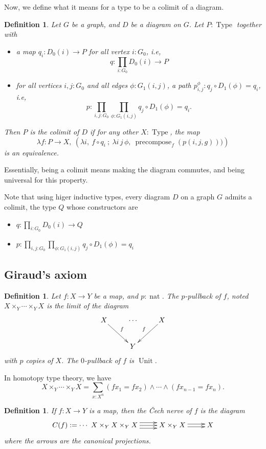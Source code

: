 \documentclass[conference]{IEEEtran}
\makeatletter
\newtheorem{defi}[thm]{Definition}
\newcommand{\ie}{i.e,\xspace}
\def\dar[#1]#2{\ar@<-#2>[#1]\ar@<#2>[#1]} %
\def\tar[#1]#2{\ar@<#2>[#1]\ar@<0pt>[#1]\ar@<-#2>[#1]} %
\DeclareMathOperator{\Type}{Type}
\DeclareMathOperator{\nat}{nat}
\DeclareMathOperator{\Unit}{Unit}
\DeclareMathOperator{\precompose}{\mathrm{precompose}}
\makeatother
\begin{document}
Now, we define what it means for a type to be a colimit of a diagram. 
\begin{defi}
Let $G$ be a graph, and $D$ be a diagram on $G$. 
Let $P:\Type$ together with
\begin{itemize}
\item a map $q_i : D_0(i) \to P$ for all
vertex $i:G_0$, \ie $$q : \prod_{i:G_0} D_0(i) \to P$$
\item for all vertices $i,j:G_0$ and all edges $\phi:G_1(i,j)$, a path
  $p_{i,j}^\phi : q_j \circ D_1(\phi) = q_i$, \ie
  $$p : \prod_{i,j:G_0} \prod_{\phi:G_1(i,j)} q_j \circ D_1(\phi) = q_i.$$
\end{itemize}

Then $P$ is the {\em colimit} of $D$ if for any other $X:\Type$, the
map
$$\lambda f:P \to X,~ \left( \lambda i,~f \circ q_i~;~ \lambda i\, j\,
  \phi,~ \precompose_f (p(i, j, g))) \right)$$
is an equivalence.
\end{defi}

Essentially, being a colimit means making the diagram commutes, and
being universal for this property.

Note that using higer inductive types, every diagram $D$ on a graph
$G$ admits a colimit, the type $Q$ whose constructors are
\begin{itemize}
\item $q:\prod_{i:G_0} D_0(i) \to Q$
\item $p:\prod_{i,j:G_0} \prod_{\phi:G_1(i,j)} q_j \circ D_1(\phi) = q_i$
\end{itemize}

\subsection{Giraud's axiom}
\label{sec:giraud-ax}

\begin{defi}
  Let $f:X \to Y$ be a map, and $p:\nat$. The $p$-pullback of $f$,
  noted $X\times_Y \cdots\times_Y X$ is
  the limit of the diagram
  $$\xymatrix{
    X \ar[rd]^f & \cdots & X \ar[ld]_f \\
      &    Y   &
  }$$
  with $p$ copies of $X$. The $0$-pullback of $f$ is $\Unit$.
\end{defi}

In homotopy type theory, we have 
$$X\times_Y \cdots\times_Y X = \sum_{x:X^n} (f x_1 = f x_2) \land
\cdots \land (f x_{n-1} = f x_n).$$
\begin{defi}
  If $f:X \to Y$ is a map, then the {\em \v{C}ech nerve} of $f$ is the
  diagram
  $$\xymatrix{
    C(f) := \cdots~ X \times_Y X \times_Y X \tar[r]{4pt} & X \times_Y X \dar[r]{2pt} & X
  }$$
where the arrows are the canonical projections.
\end{defi}
\end{document}
